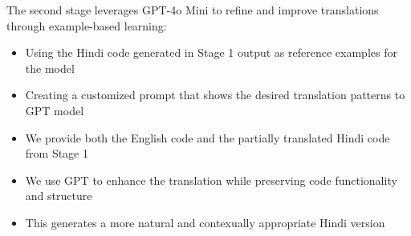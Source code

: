 \documentclass[11pt,a4paper]{article}
\begin{document}
\begin{itemize}[itemsep=0pt, topsep=0pt]
                The second stage leverages GPT-4o Mini to refine and improve translations through example-based learning:
                \begin{itemize}[itemsep=0pt, topsep=0pt]
                    \item Using the Hindi code generated in Stage 1 output as reference examples for the model
                    \item Creating a customized prompt that shows the desired translation patterns to GPT model
                    \item We provide both the English code and the partially translated Hindi code from Stage 1
                    \item We use GPT to enhance the translation while preserving code functionality and structure
                    \item This generates a more natural and contexually appropriate Hindi version 
                \end{itemize}
            \end{itemize}
\end{document}
